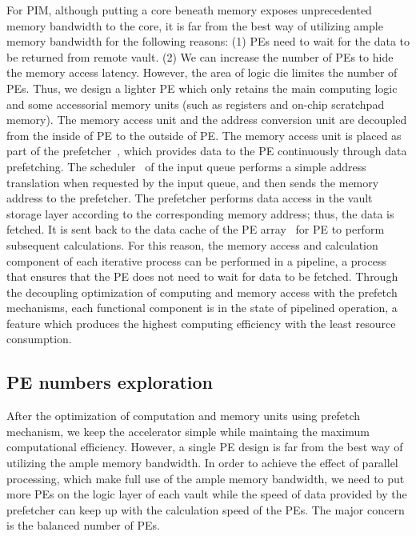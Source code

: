\documentclass[9pt,conference]{IEEEtran}
\newcommand*\circled[1]{\tikz[baseline=(char.base)]{
		\node[shape=circle,fill,inner sep=0.5pt] (char) {\textcolor{white}{#1}};}}
\begin{document}
For PIM, although putting a core beneath memory exposes unprecedented memory bandwidth to the core, it is far from the best way of utilizing ample memory bandwidth for the
following reasons: (1) PEs need to wait for the data to be returned from remote vault. (2) We can increase the number of PEs to hide the memory access latency. However, the area of logic die limites the number of PEs. Thus, we design a lighter PE which only retains the main computing logic and some accessorial memory units (such as registers and on-chip scratchpad memory). The memory access unit and the address conversion unit are decoupled from the inside of PE to the outside of PE. The memory access unit is placed as part of the prefetcher~\circled{2}, which provides data to the PE continuously through data prefetching. The scheduler~\circled{1} of the input queue performs a simple address translation when requested by the input queue, and then sends the memory address to the prefetcher. The prefetcher performs data access in the vault storage layer according to the corresponding memory address; thus, the data is fetched. It is sent back to the data cache of the PE array~\circled{3} for PE to perform subsequent calculations. For this reason, the memory access and calculation component of each iterative process can be performed in a pipeline, a process that ensures that the PE does not need to wait for data to be fetched. Through the decoupling optimization of computing and memory access with the prefetch mechanisms, each functional component is in the state of pipelined operation, a feature which produces the highest computing efficiency with the least resource consumption.

\subsection{PE numbers exploration}
\label{sec:arch:pe_number}
After the optimization of computation and memory units using prefetch mechanism, we keep the accelerator simple while maintaing the maximum computational efficiency. However, a single PE design is far from the best way of utilizing the ample memory bandwidth. In order to achieve the effect of parallel processing, which make full use of the ample memory bandwidth, we need to put more PEs on the logic layer of each vault while the speed of data provided by the prefetcher can keep up with the calculation speed of the PEs. The major concern is the balanced number of PEs. 
\end{document}

